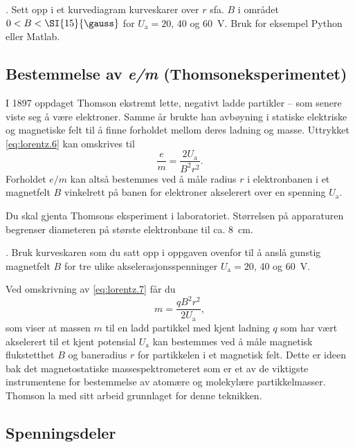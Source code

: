 \documentclass[../Elmag-labhefte-2020.tex]{subfiles}
\begin{document}
{.  Sett opp i et kurvediagram kurveskarer over $r$ sfa. $B$ i området $0 < B < \SI{15}{\gauss}$ for $U_\mathrm{a} = 20$, \num{40} og \SI{60}{\volt}}. Bruk for eksempel Python eller Matlab.


\subsection{Bestemmelse av \textsl{e/m} (Thomsoneksperimentet)}
 
I 1897 oppdaget Thomson
ekstremt lette, negativt ladde partikler -- som senere viste seg å være elektroner. Samme år brukte han avbøyning i statiske elektriske og magnetiske felt til å finne forholdet mellom deres ladning og masse. Uttrykket \eqref{eq:lorentz.6} kan omskrives til 
\begin{equation}
    \frac{e}{m} = \frac{2 U_\mathrm{a}} {B^2 r^2}.
    \label{eq:lorentz.7}
\end{equation}
%
Forholdet $e/m$ kan altså bestemmes ved å måle radius $r$ i elektronbanen i et magnetfelt $B$ vinkelrett på banen for elektroner akselerert over en spenning $U_\mathrm{a}$. 

Du skal gjenta Thomsons eksperiment i laboratoriet. Størrelsen på apparaturen begrenser diameteren på største elektronbane til ca. \SI{8}{\cm}. 

{.  Bruk kurveskaren som du satt opp i oppgaven ovenfor til å anslå gunstig magnetfelt $B$ for tre ulike akselerasjonsspenninger $U_\mathrm{a} = 20$, \num{40} og \SI{60}{\volt}.}
 
Ved omskrivning av \eqref{eq:lorentz.7} får du 
\begin{equation}
    m = \frac{q B^2 r^2}{2 U_\mathrm{a}},
    \label{eq:lorentz.8}
\end{equation}
%
som viser at massen $m$ til en ladd partikkel med kjent ladning $q$ som har vært akselerert til et kjent potensial $U_\mathrm{a}$ kan bestemmes ved å måle magnetisk flukstetthet $B$ og baneradius $r$ for partikkelen i et magnetisk felt. Dette er ideen bak det magnetostatiske massespektrometeret som er et av de viktigste instrumentene for bestemmelse av atomære og molekylære partikkelmasser. Thomson la med sitt arbeid grunnlaget for denne teknikken.

\subsection{Spenningsdeler \label{lorentz.spenningsdeler}}
 
\end{document}
